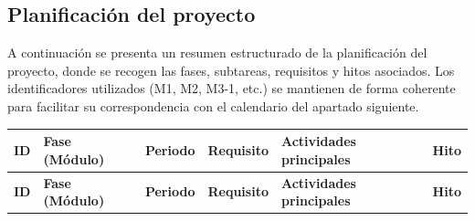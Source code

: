 \documentclass[IB,BIB]{TFUOC}%
\begin{document}
\newpage

\subsection{Planificación del proyecto}
\label{sec:planificacion}

A continuación se presenta un resumen estructurado de la planificación del proyecto, donde se recogen las fases, subtareas, requisitos y hitos asociados. Los identificadores utilizados (M1, M2, M3-1, etc.) se mantienen de forma coherente para facilitar su correspondencia con el calendario del apartado siguiente.

\begin{longtable}{p{1cm} !{\vrule width 0.1pt} p{2.85cm} !{\vrule width 0.1pt} p{1.7cm} !{\vrule width 0.1pt} p{2cm} !{\vrule width 0.1pt} p{4.5cm} !{\vrule width 0.1pt} p{4cm}}

\toprule
\toprule
\textbf{ID} & \textbf{Fase (Módulo)} & \textbf{Periodo} & \textbf{Requisito} & \textbf{Actividades principales} & \textbf{Hito} \\
\midrule
\midrule
\endfirsthead

\toprule
\toprule
\textbf{ID} & \textbf{Fase (Módulo)} & \textbf{Periodo} & \textbf{Requisito} & \textbf{Actividades principales} & \textbf{Hito} \\
\midrule
\midrule
\endhead


\end{longtable}
\end{document}
